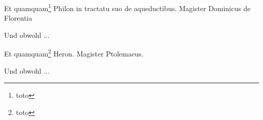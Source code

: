 \documentclass{book}
\begin{document}
\begin{ledgroup}
\begin{pairs}
\begin{Leftside}
\beginnumbering
\pstart
Et quamquam\footnote{toto} Philon in tractatu suo de aqueductibus. Magister Dominicus de Florentia
\pend
\endnumbering
\end{Leftside}

\begin{Rightside}
\beginnumbering
\pstart
Und obwohl ...
\pend
\endnumbering
\end{Rightside}

\end{pairs}
\Columns
\end{ledgroup}




\begin{ledgroup}
\setcounter{footnoteC}{0}
\setcounter{footnote}{0}
\begin{pairs}
\begin{Leftside}
\beginnumbering
\pstart
Et quamquam\footnote{toto} Heron. Magister Ptolemaeus.
\pend
\endnumbering
\end{Leftside}

\begin{Rightside}
\beginnumbering
\pstart
Und obwohl ...
\pend
\endnumbering
\end{Rightside}

\end{pairs}
\Columns
\end{ledgroup}


\newpage
\printindex[res]
\printindex[pers]
\end{document}
